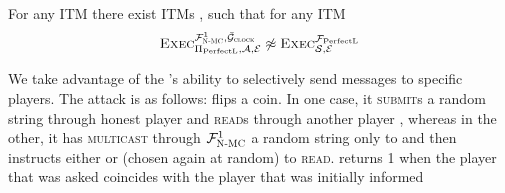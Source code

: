   \begin{theorem}
    \label{theorem:perfectledger}
    For any ITM \perfectprot{} there exist ITMs \perfectenv,
    \perfectadv{} such that for any ITM \simulator
    \begin{equation*}
      \textsc{Exec}^{\mathcal{F}_{\textsc{N-MC}}^1, \bar{\mathcal{G}}_{\textsc{clock}}}_{\Pi_{\mathrm{PerfectL}}, \mathcal{A},
      \mathcal{E}} \not\approx \textsc{Exec}^{\mathcal{F}_{\mathrm{PerfectL}}}_{\mathcal{S},
      \mathcal{E}}
    \end{equation*}
  \end{theorem}

  \begin{proofsketch}
    We take advantage of the \adversary's ability to selectively send messages
    to specific players. The attack is as follows: \environment{} flips a coin.
    In one case, it \textsc{submit}s a random string through honest player
    \alice{} and \textsc{read}s through another player \bob,
    whereas in the other, it has \adversary{} \textsc{multicast} through
    $\mathcal{F}_{\textsc{N-MC}}^1$ a random string only to \alice and then instructs either
    \alice{} or \bob{} (chosen again at random) to \textsc{read}. \environment{}
    returns 1 when the player that was asked coincides with the player that was
    initially informed 
  \end{proofsketch}

